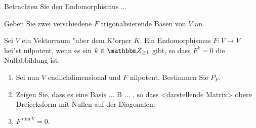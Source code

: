 \documentclass[a4,11pt]{article}
\begin{document}
\vspace*{-17mm}
{
\kopf
}


\begin{aufgabe}[4 Punkte]
  Betrachten Sie den Endomorphismus ...

  Geben Sie zwei verschiedene $F$ trigonalisierende Basen von $V$ an.
\end{aufgabe}

\begin{aufgabe}[4 Punkte]
  Sei $V$ ein Vektorraum "uber dem K"orper
  $K$. Ein Endomorphismus $F \colon V \to V$ hei"st nilpotent, wenn es
  ein $k \in \Z_{\ge 1}$ gibt, so dass $F^k=0$ die Nullabbildung ist.

\begin{enumerate}
\item Sei nun $V$ endlichdimensional und $F$ nilpotent. Bestimmen Sie
  $P_F$.
\item Zeigen Sie, dass es eine Basis  ... B ... , so dass
  <darstellende Matrix> obere Dreiecksform mit Nullen auf der
  Diagonalen.
\item $F^{\dim V} = 0$.
\end{enumerate}

\end{aufgabe}


\end{document}
